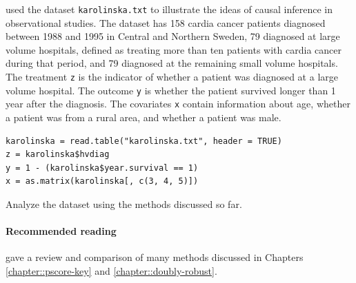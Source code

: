  \citet{rubin2008objective} used the dataset \texttt{karolinska.txt} to illustrate the ideas of causal inference in observational studies. 
 The dataset has 158 cardia cancer patients diagnosed between 1988 and 1995 in Central and Northern Sweden, 79 diagnosed at large volume hospitals, defined as treating more than ten patients with cardia cancer during that period, and 79 diagnosed at the remaining small volume hospitals. The treatment \texttt{z}  is the indicator of whether a patient was diagnosed at a large volume hospital. The outcome \texttt{y} is whether the patient survived longer than 1 year after the diagnosis. The covariates \texttt{x} contain information about age, whether a patient was from a rural area, and whether a patient was male. 
 
\begin{lstlisting}
karolinska = read.table("karolinska.txt", header = TRUE)
z = karolinska$hvdiag
y = 1 - (karolinska$year.survival == 1)
x = as.matrix(karolinska[, c(3, 4, 5)])
\end{lstlisting}


Analyze the dataset using the methods discussed so far. 



 \paragraph{Recommended reading}
 
 \citet{lunceford2004stratification} gave a review and comparison of many methods discussed in Chapters \ref{chapter::pscore-key} and \ref{chapter::doubly-robust}. 
 

